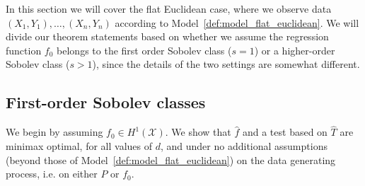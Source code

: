 \documentclass{article}
\newcommand{\1}{\mathbf{1}}
\newcommand{\mc}[1]{\mathcal{#1}}
\newcommand{\wh}[1]{\widehat{#1}}
\theoremstyle{alden}
\theoremstyle{aldenthm}
\theoremstyle{definition}
\theoremstyle{remark}
\begin{document}
In this section we will cover the flat Euclidean case, where we observe data $(X_1,Y_1),\ldots,(X_n,Y_n)$ according to Model~\ref{def:model_flat_euclidean}. We will divide our theorem statements based on whether we assume the regression function $f_0$ belongs to the first order Sobolev class ($s = 1$) or a higher-order Sobolev class ($s > 1$), since the details of the two settings are somewhat different.

\subsection{First-order Sobolev classes}
\label{sec:first_order_sobolev_classes}
We begin by assuming $f_0 \in H^1(\mc{X})$. We show that $\wh{f}$ and a test based on $\wh{T}$ are minimax optimal, for all values of $d$, and under no additional assumptions (beyond those of Model~\ref{def:model_flat_euclidean}) on the data generating process, i.e. on either $P$ or $f_0$.
\end{document}

